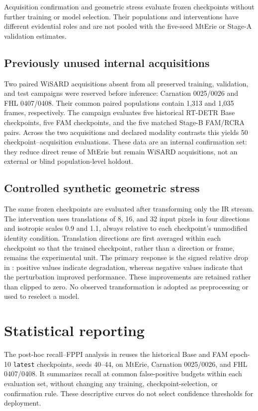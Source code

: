 Acquisition confirmation and geometric stress evaluate frozen checkpoints
without further training or model selection. Their populations and
interventions have different evidential roles and are not pooled with the
five-seed MtErie or Stage-A validation estimates.

\subsection{Previously unused internal acquisitions}

Two paired WiSARD acquisitions absent from all preserved training, validation,
and test campaigns were reserved before inference: Carnation 0025/0026 and FHL
0407/0408. Their common paired populations contain 1,313 and 1,035 frames,
respectively. The campaign evaluates five historical RT-DETR Base checkpoints,
five FAM checkpoints, and the five matched Stage-B FAM/RCRA pairs. Across
the two acquisitions and declared modality contrasts this yields 50
checkpoint--acquisition evaluations. These data are an internal confirmation
set: they reduce direct reuse of MtErie but remain WiSARD acquisitions, not an
external or blind population-level holdout.

\subsection{Controlled synthetic geometric stress}

The same frozen checkpoints are evaluated after transforming only the IR
stream. The intervention uses translations of 8, 16, and 32 input pixels in
four directions and isotropic scales 0.9 and 1.1, always relative to each
checkpoint's unmodified identity condition. Translation directions are first
averaged within each checkpoint so that the trained checkpoint, rather than a
direction or frame, remains the experimental unit. The primary response is the
signed relative drop in \mapfifty{}: positive values indicate degradation,
whereas negative values indicate that the perturbation improved performance.
These improvements are retained rather than clipped to zero. No observed
transformation is adopted as preprocessing or used to reselect a model.

\section{Statistical reporting}

The post-hoc recall--FPPI analysis in  reuses the
historical Base and FAM epoch-10 \texttt{latest} checkpoints, seeds 40--44,
on MtErie, Carnation 0025/0026, and FHL 0407/0408.
It summarizes recall at common false-positive budgets within each evaluation set,
without changing any training, checkpoint-selection, or confirmation rule.
These descriptive curves do not select confidence thresholds for deployment.

